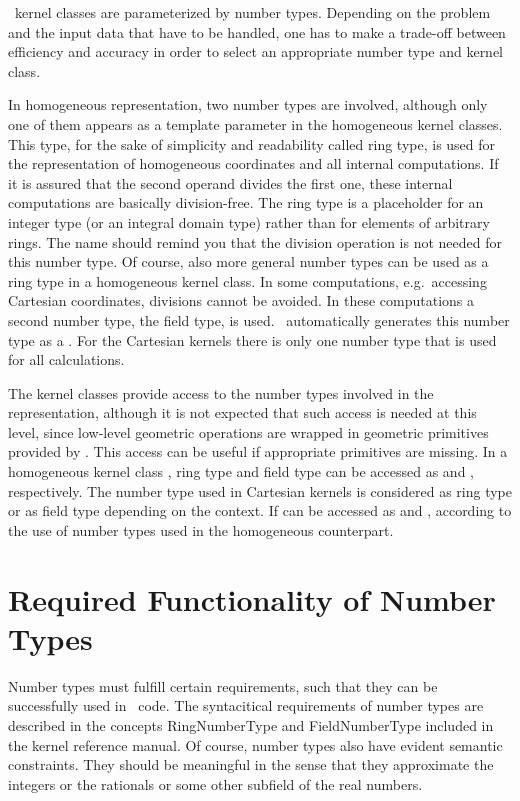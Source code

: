 
\cgal\ kernel classes are parameterized by number types.  
Depending on the problem and the input data that have to be handled,
one has to make a trade-off between efficiency and accuracy in 
order to select an appropriate number type and kernel class.

In homogeneous representation, two number types are involved,
although only one of them appears as a template parameter in
the homogeneous kernel classes.
This type, for the sake of simplicity and readability called ring type, is
used for the representation of homogeneous coordinates and all 
internal computations. 
If it is assured that the second operand divides the first one, these 
internal computations are basically division-free.
The ring type is a placeholder for an integer type (or an integral 
domain type) rather than for elements of arbitrary rings. 
The name should remind you that the division operation is not
needed for this number type.
Of course, also more general number types can be used as a ring type 
in a homogeneous kernel class. In some computations, e.g.\ accessing 
Cartesian coordinates, divisions cannot be avoided. In these computations a 
second number type, the field type, is used. \cgal\ automatically generates 
this number type as a . For the Cartesian kernels 
there is only one number type that is used for all calculations.

The kernel classes provide access to the number types 
involved in the representation, although it is not expected that
such access is needed at this level, since low-level geometric 
operations are wrapped in geometric primitives provided by \cgal.
This access can be useful if appropriate primitives are missing.
In a homogeneous kernel class , ring type and field
type can be accessed as  and , respectively.
The number type used in Cartesian kernels is considered as 
ring type or as field type depending on the context.
If can be accessed as  and , according
to the use of number types used in the homogeneous counterpart.

\section{Required Functionality of Number Types\label{nt-requirements}}

Number types must fulfill certain requirements, such that they can
be successfully used in \cgal\ code.  The syntacitical requirements of
number types are described in
the concepts RingNumberType and FieldNumberType included in the 
kernel reference manual.
Of course, number types also
have evident semantic constraints. They should be meaningful in the
sense that they approximate the integers or the rationals 
or some other subfield of the real numbers.

